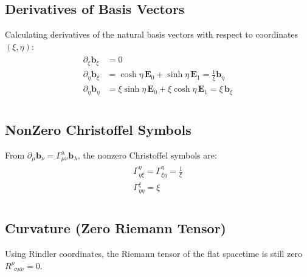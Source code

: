 \documentclass[letterpaper,10pt,english]{jupyterBook}
\begin{document}
\subsection{Derivatives of Basis Vectors}
\label{\detokenize{ch/relativity-special/rindler:derivatives-of-basis-vectors}}
\sphinxAtStartPar
Calculating derivatives of the natural basis vectors with respect to coordinates \((\xi, \eta)\):
\begin{equation*}
\begin{split}\begin{aligned}
  \partial_{\xi} \mathbf{b}_{\xi} & = 0 \\
  \partial_\eta  \mathbf{b}_{\xi} & = \cosh\eta \, \mathbf{E}_0 + \sinh\eta \, \mathbf{E}_1 = \frac{1}{\xi} \mathbf{b}_\eta \\
  \partial_\eta  \mathbf{b}_\eta  & = \xi \sinh\eta \, \mathbf{E}_0 + \xi \cosh\eta \, \mathbf{E}_1 = \xi \, \mathbf{b}_{\xi} \\
\end{aligned}\end{split}
\end{equation*}

\subsection{Non\sphinxhyphen{}Zero Christoffel Symbols}
\label{\detokenize{ch/relativity-special/rindler:non-zero-christoffel-symbols}}
\sphinxAtStartPar
From \(\partial_\mu \mathbf{b}_\nu = \Gamma^\lambda_{\mu\nu} \mathbf{b}_\lambda\), the non\sphinxhyphen{}zero Christoffel symbols are:
\begin{equation*}
\begin{split}\begin{aligned}
  \Gamma^\eta_{\eta \xi} = \Gamma^\eta_{\xi \eta} = \frac{1}{\xi} \\
  \Gamma^{\xi}_{\eta\eta} = \xi \\
\end{aligned}\end{split}
\end{equation*}

\subsection{Curvature (Zero Riemann Tensor)}
\label{\detokenize{ch/relativity-special/rindler:curvature-zero-riemann-tensor}}
\sphinxAtStartPar
Using Rindler coordinates, the Riemann tensor of the flat spacetime is still zero \(R^{\rho}_{\ \ \sigma \mu \nu} = 0\).
\end{document}
